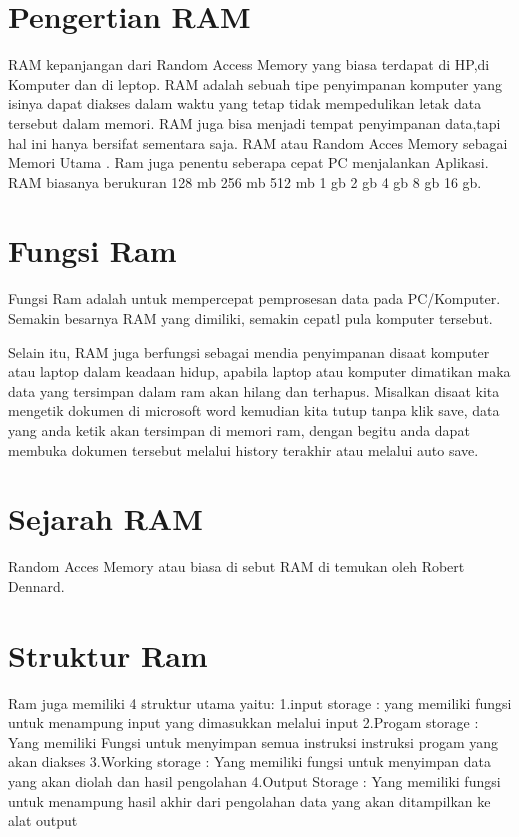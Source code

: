 \section{Pengertian RAM}
RAM kepanjangan dari Random Access Memory yang biasa terdapat di HP,di Komputer dan di leptop.
RAM adalah sebuah tipe penyimpanan komputer yang isinya dapat diakses dalam waktu yang tetap tidak mempedulikan letak data tersebut dalam memori.
RAM juga bisa menjadi tempat penyimpanan data,tapi hal ini hanya bersifat sementara saja.
RAM atau Random Acces Memory sebagai Memori Utama . Ram juga penentu seberapa cepat PC menjalankan Aplikasi.
RAM biasanya berukuran 128 mb 256 mb 512 mb 1 gb 2 gb 4 gb 8 gb 16 gb.

\section{Fungsi Ram}

Fungsi Ram adalah untuk mempercepat pemprosesan data pada PC/Komputer. 
Semakin besarnya RAM yang dimiliki, 
semakin cepatl pula komputer tersebut.

Selain itu, RAM juga berfungsi sebagai mendia penyimpanan disaat komputer atau laptop dalam keadaan hidup, 
apabila laptop atau komputer dimatikan maka data yang tersimpan dalam ram akan hilang dan terhapus. 
Misalkan disaat kita mengetik dokumen di microsoft word kemudian kita tutup tanpa klik save, 
data yang anda ketik akan tersimpan di memori ram, dengan begitu anda dapat membuka dokumen tersebut melalui history terakhir atau melalui auto save.

\section{Sejarah RAM}
Random Acces Memory atau biasa di sebut RAM di temukan oleh Robert Dennard.









\section{Struktur Ram}

Ram juga memiliki 4 struktur utama yaitu:
1.input storage : yang memiliki fungsi untuk menampung input yang dimasukkan melalui input
2.Progam storage : Yang memiliki Fungsi untuk menyimpan semua instruksi instruksi progam yang akan diakses
3.Working storage : Yang memiliki fungsi untuk menyimpan data yang akan diolah dan hasil pengolahan
4.Output Storage : Yang memiliki fungsi untuk menampung hasil akhir dari pengolahan data yang akan ditampilkan ke alat output